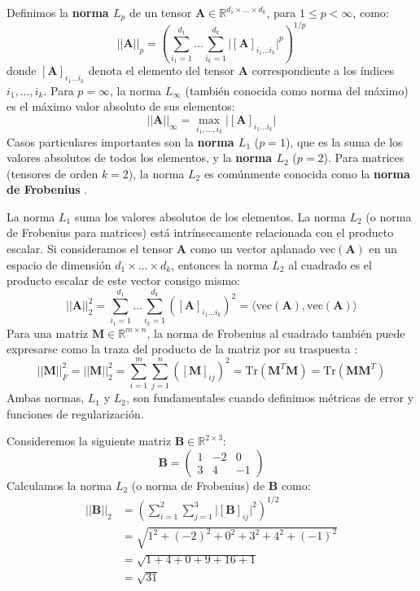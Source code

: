 \begin{definition}
\label{def:lp_norm}
Definimos la \textbf{norma $L_p$} de un tensor $\mathbf{A} \in \mathbb{R}^{d_1 \times \dots \times d_k}$, para $1 \le p < \infty$, como:
\[ ||\mathbf{A}||_p = \left( \sum_{i_1=1}^{d_1} \dots \sum_{i_k=1}^{d_k} \lvert [\mathbf{A}]_{i_1 \dots i_k} \rvert^p \right)^{1/p} \]
donde $[\mathbf{A}]_{i_1 \dots i_k}$ denota el elemento del tensor $\mathbf{A}$ correspondiente a los índices $i_1, \dots, i_k$.
Para $p=\infty$, la norma $L_\infty$ (también conocida como norma del máximo) es el máximo valor absoluto de sus elementos:
\[ ||\mathbf{A}||_\infty = \max_{i_1, \dots, i_k} \lvert [\mathbf{A}]_{i_1 \dots i_k} \rvert \]
Casos particulares importantes son la \textbf{norma $L_1$} ($p=1$), que es la suma de los valores absolutos de todos los elementos, y la \textbf{norma $L_2$} ($p=2$). Para matrices (tensores de orden $k=2$), la norma $L_2$ es comúnmente conocida como la \textbf{norma de Frobenius} \citep{GolubVanLoan2013, Bishop2006}.
\end{definition}

La norma $L_1$ suma los valores absolutos de los elementos. La norma $L_2$ (o norma de Frobenius para matrices) está intrínsecamente relacionada con el producto escalar. Si consideramos el tensor $\mathbf{A}$ como un vector aplanado $\text{vec}(\mathbf{A})$ en un espacio de dimensión $d_1 \times \dots \times d_k$, entonces la norma $L_2$ al cuadrado es el producto escalar de este vector consigo mismo:
\[ ||\mathbf{A}||_2^2 = \sum_{i_1=1}^{d_1} \dots \sum_{i_k=1}^{d_k} ([\mathbf{A}]_{i_1 \dots i_k})^2 = \langle \text{vec}(\mathbf{A}), \text{vec}(\mathbf{A}) \rangle \]
Para una matriz $\mathbf{M} \in \mathbb{R}^{m \times n}$, la norma de Frobenius al cuadrado también puede expresarse como la traza del producto de la matriz por su traspuesta \citep{GolubVanLoan2013}:
\[ ||\mathbf{M}||_F^2 = ||\mathbf{M}||_2^2 = \sum_{i=1}^{m} \sum_{j=1}^{n} ([\mathbf{M}]_{ij})^2 = \text{Tr}(\mathbf{M}^T \mathbf{M}) = \text{Tr}(\mathbf{M} \mathbf{M}^T) \]
Ambas normas, $L_1$ y $L_2$, son fundamentales cuando definimos métricas de error y funciones de regularización.

\begin{example}

Consideremos la siguiente matriz $\mathbf{B} \in \mathbb{R}^{2 \times 3}$:
\[ \mathbf{B} = \begin{pmatrix} 1 & -2 & 0 \\ 3 & 4 & -1 \end{pmatrix} \]
Calculamos la norma $L_2$ (o norma de Frobenius) de $\mathbf{B}$ como:
\begin{align*}
||\mathbf{B}||_2 &= \left( \sum_{i=1}^{2} \sum_{j=1}^{3} \lvert [\mathbf{B}]_{ij} \rvert^2 \right)^{1/2} \\
&= \sqrt{1^2 + (-2)^2 + 0^2 + 3^2 + 4^2 + (-1)^2} \\
&= \sqrt{1 + 4 + 0 + 9 + 16 + 1} \\
&= \sqrt{31}
\end{align*}
\end{example}

